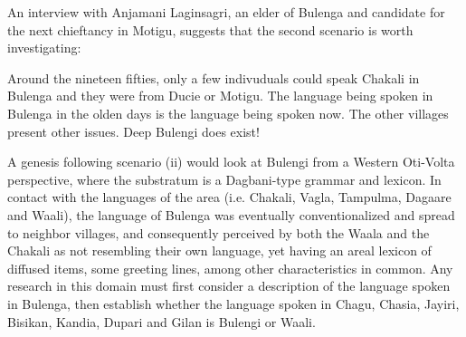 An interview with Anjamani Laginsagri, an elder of Bulenga and
candidate for the next chieftancy  in Motigu,  suggests that the
second scenario is worth  investigating:


\begin{Lquote}
Around the nineteen fifties, only a few indivuduals could speak Chakali in
Bulenga
and they were from Ducie or Motigu. The language being spoken in
Bulenga in the
olden days is the language  being spoken now. The other villages present other
issues. Deep Bulengi does exist!
\end{Lquote}
\vspace*{2ex}
 


A genesis following scenario (ii) would look at Bulengi from a Western
Oti-Volta perspective, where the substratum is a Dagbani-type grammar and
lexicon. In contact with the languages of the area (i.e. Chakali, Vagla,
Tampulma,  Dagaare and Waali), the language of Bulenga was eventually
conventionalized and spread to neighbor villages, and consequently perceived by
both the Waala and the Chakali
as not resembling their own language, yet having an areal lexicon of diffused items, some greeting
lines,  among other characteristics in common. Any research in this domain must
first consider a description of the language spoken in Bulenga, then 
establish whether the language spoken in   Chagu, Chasia, Jayiri, Bisikan,
Kandia, Dupari and Gilan is Bulengi or Waali. 


% 







